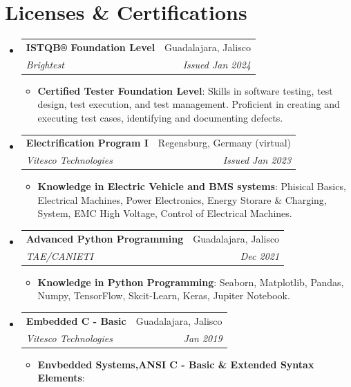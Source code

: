 \documentclass[letterpaper,11pt]{article}
\makeatletter
\newcommand{\resumeItem}[2]{
  \item\small{
    \textbf{#1}{: #2 \vspace{-2pt}}
  }
}
\newcommand{\resumeSubheading}[4]{
  \vspace{-1pt}\item
    \begin{tabular*}{0.97\textwidth}[t]{l@{\extracolsep{\fill}}r}
      \textbf{#1} & #2 \\
      \textit{\small#3} & \textit{\small #4} \\
    \end{tabular*}\vspace{-5pt}
}
\newcommand{\resumeSubHeadingListStart}{\begin{itemize}[leftmargin=*]}
\newcommand{\resumeSubHeadingListEnd}{\end{itemize}}
\newcommand{\resumeItemListStart}{\begin{itemize}}
\newcommand{\resumeItemListEnd}{\end{itemize}\vspace{-5pt}}
\makeatother
\begin{document}
\section{Licenses \& Certifications}
  \resumeSubHeadingListStart
    \resumeSubheading
      {ISTQB® Foundation Level}{Guadalajara, Jalisco}
      {Brightest}{Issued Jan 2024}
      \resumeItemListStart
        \resumeItem{Certified Tester Foundation Level}
          {Skills in software testing, test design, test execution, and test management. Proficient in creating and executing test cases, identifying and documenting defects.} 
      \resumeItemListEnd
    \resumeSubheading
      {Electrification Program I}{Regensburg, Germany (virtual)}
      {Vitesco Technologies}{Issued Jan 2023}
      \resumeItemListStart
        \resumeItem{Knowledge in Electric Vehicle and BMS systems}
          {Phisical Basics, Electrical Machines, Power Electronics, Energy Storare \& Charging, System, EMC High Voltage, Control of Electrical Machines.}
      \resumeItemListEnd
    \resumeSubheading
      {Advanced Python Programming}{Guadalajara, Jalisco}
      {TAE/CANIETI}{Dec 2021}
      \resumeItemListStart
        \resumeItem{Knowledge in Python Programming}
          {Seaborn, Matplotlib, Pandas, Numpy, TensorFlow, Skcit-Learn, Keras, Jupiter Notebook.}
      \resumeItemListEnd
    \resumeSubheading
      {Embedded C - Basic}{Guadalajara, Jalisco}
      {Vitesco Technologies}{Jan 2019}
      \resumeItemListStart
        \resumeItem{Envbedded Systems,ANSI C - Basic \& Extended Syntax Elements}
          {}
      \resumeItemListEnd
  \resumeSubHeadingListEnd

\end{document}
